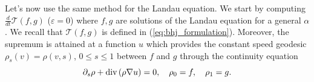 \documentclass[11pt]{amsart}
\numberwithin{equation}{section}
\begin{document}
Let's now use the same method for the Landau equation. We start by computing  $\frac{d}{dt}\mathcal T(f,g)$ ($\varepsilon =0$) where $f,g$ are solutions of the Landau equation for a general $\alpha$.  We recall that $ \mathcal{T}(f,g)$ is defined in  (\ref{eq:bhj_formulation}). Moreover, the supremum is attained at a function $u$ which provides the constant speed geodesic $\rho_s(v)=\rho(v,s)$, $0\leq s\leq 1$ between $f$ and $g$ through the continuity equation
%
\begin{equation}\label{eq:CE}
  \partial_{s}\rho+\textnormal{div}\left(\rho\nabla u\right)=0,\quad\rho_{0}=f,\quad\rho_{1}=g.
\end{equation}
%
\end{document}
